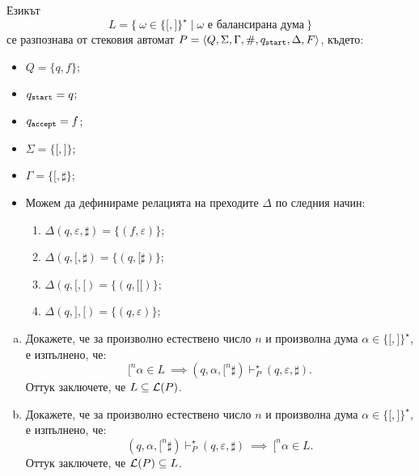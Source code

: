 \begin{example}
  Езикът
  \[L = \{\ \omega \in \{\texttt{[},\texttt{]}\}^\star \mid \omega\text{ е балансирана дума}\ \}\]
  се разпознава от стековия автомат $P = \langle{Q,\Sigma,\Gamma,\#,q_{\texttt{start}},\Delta,F}\rangle$, където:
  \begin{itemize}
  \item 
    $Q = \{q,f\}$;
  \item
    $q_{\texttt{start}} = q$;
  \item
    $q_{\texttt{accept}} = f$;
  \item
    $\Sigma = \{\texttt{[},\texttt{]}\}$;
  \item
    $\Gamma = \{\texttt{[}, \sharp\}$;
  \item
    Можем да дефинираме релацията на преходите $\Delta$ по следния начин:
    \begin{enumerate}[(1)]
    \item 
      $\Delta(q, \varepsilon, \sharp) = \{(f, \varepsilon)\}$;
    \item
      $\Delta(q, \texttt{[}, \sharp) = \{(q, \texttt{[}\sharp)\}$;
    \item
      $\Delta(q, \texttt{[}, \texttt{[}) = \{(q, \texttt{[[})\}$;
    \item
      $\Delta(q, \texttt{]}, \texttt{[}) = \{(q, \varepsilon)\}$;
    \end{enumerate}
  \end{itemize}  
  \begin{enumerate}[(a)]
  \item
    Докажете, че за произволно естествено число $n$ и произволна дума $\alpha \in \{\texttt{[}, \texttt{]}\}^\star$, 
    е изпълнено, че:
    \[\texttt{[}^n\alpha \in L\ \implies (q, \alpha, \texttt{[}^n\sharp) \vdash^\star_P (q, \varepsilon, \sharp).\]
    Оттук заключете, че $L \subseteq \mathcal{L}(P)$.
  \item
    Докажете, че за произволно естествено число $n$ и произволна дума $\alpha \in \{\texttt{[}, \texttt{]}\}^\star$, е изпълнено, че:
    \[(q,\alpha,\texttt{[}^n\sharp) \vdash^\star_P (q, \varepsilon, \sharp)\ \implies\ \texttt{[}^n\alpha \in L.\]
    Оттук заключете, че $\mathcal{L}(P) \subseteq L$.
  \end{enumerate}
\end{example}

